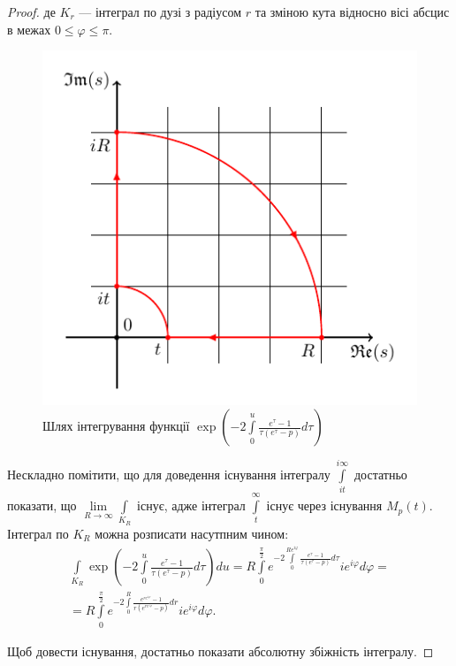 \begin{lem}
\begin{proof}
де $K_{r}$ --- інтеграл по дузі з радіусом $r$ та зміною кута відносно вісі абсцис в межах $0 \leq \varphi \leq \pi$.
\begin{figure}[h]
	\centering
	\includegraphics{chapter_Asymptotics/img/contour_quarter}
	\caption{Шлях інтегрування функції $\exp\left(-2 \int\limits_{0}^{u} \frac{e^\tau -1}{\tau(e^\tau - p)} d\tau\right)$}
	\label{fig:contour_phi}
\end{figure}

Нескладно помітити, що для доведення існування інтегралу $\int\limits_{it}^{i\infty}$ достатньо показати, що $\lim\limits_{R \rightarrow \infty} \int\limits_{K_{R}}$ існує, адже інтеграл $\int\limits_{t}^{\infty}$ існує через існування $M_{p}(t)$. Інтеграл по $K_{R}$ можна розписати насутпним чином:
\begin{gather*}
\int\limits_{K_{R}} \exp\left(-2 \int\limits_{0}^{u} \frac{e^\tau -1}{\tau(e^\tau - p)} d\tau\right) du = 
R \int\limits_{0}^{\frac{\pi}{2}} e^{-2 \int\limits_{0}^{Re^{i\varphi}} \frac{e^\tau -1}{\tau(e^\tau - p)} d\tau} i e^{i\varphi}  d\varphi =\\
= R \int\limits_{0}^{\frac{\pi}{2}} e^{-2 \int\limits_{0}^{R} \frac{e^{re^{i\varphi}} -1}{r(e^{re^{i\varphi}} - p)} dr} i e^{i\varphi}  d\varphi.
\end{gather*}

Щоб довести існування, достатньо показати абсолютну збіжність інтегралу.


\end{proof}
\end{lem}
